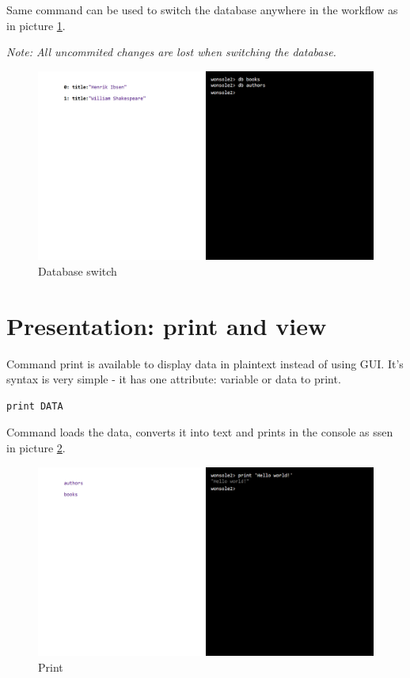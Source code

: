 Same command can be used to switch the database anywhere in the workflow as in
picture \ref{wonsole2-04}.

\textit{Note: All uncommited changes are lost when switching the database.}

\begin{figure}
\centering
\includegraphics[width=\textwidth]{../../manual/screenshot/wonsole2/wonsole2-04.png}
\caption{Database switch}
\label{wonsole2-04}
\end{figure}

\section{Presentation: print and view}
Command print is available to display data in plaintext instead of using GUI.
It's syntax is very simple - it has one attribute: variable or data to print.
\begin{verbatim}
print DATA
\end{verbatim}
Command loads the data, converts it into text and prints in the console as ssen
in picture \ref{wonsole2-10}.

\begin{figure}
\centering
\includegraphics[width=\textwidth]{../../manual/screenshot/wonsole2/wonsole2-10.png}
\caption{Print}
\label{wonsole2-10}
\end{figure}

